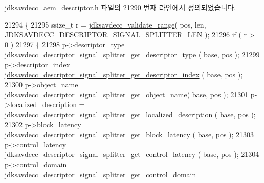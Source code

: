 jdksavdecc\+\_\+aem\+\_\+descriptor.\+h 파일의 21290 번째 라인에서 정의되었습니다.


\begin{DoxyCode}
21294 \{
21295     ssize\_t r = \hyperlink{group__util_ga9c02bdfe76c69163647c3196db7a73a1}{jdksavdecc\_validate\_range}( pos, len, 
      \hyperlink{group__descriptor__signal__splitter_ga3afbcd74a73da7fe7c5eee3c13fad7f3}{JDKSAVDECC\_DESCRIPTOR\_SIGNAL\_SPLITTER\_LEN} );
21296     \textcolor{keywordflow}{if} ( r >= 0 )
21297     \{
21298         p->\hyperlink{structjdksavdecc__descriptor__signal__splitter_ab7c32b6c7131c13d4ea3b7ee2f09b78d}{descriptor\_type} = 
      \hyperlink{group__descriptor__signal__splitter_ga2d820535595d7a1730629dc8cfe72a04}{jdksavdecc\_descriptor\_signal\_splitter\_get\_descriptor\_type}
      ( base, pos );
21299         p->\hyperlink{structjdksavdecc__descriptor__signal__splitter_a042bbc76d835b82d27c1932431ee38d4}{descriptor\_index} = 
      \hyperlink{group__descriptor__signal__splitter_ga4fe9ee5536c672b456535486c30be9fa}{jdksavdecc\_descriptor\_signal\_splitter\_get\_descriptor\_index}
      ( base, pos );
21300         p->\hyperlink{structjdksavdecc__descriptor__signal__splitter_a7d1f5945a13863b1762fc6db74fa8f80}{object\_name} = 
      \hyperlink{group__descriptor__signal__splitter_gac38a72dc2c8d33e642ee20458c317335}{jdksavdecc\_descriptor\_signal\_splitter\_get\_object\_name}(
       base, pos );
21301         p->\hyperlink{structjdksavdecc__descriptor__signal__splitter_a0926f846ca65a83ad5bb06b4aff8f408}{localized\_description} = 
      \hyperlink{group__descriptor__signal__splitter_ga298db41e20729dde86f44a7c5db0d539}{jdksavdecc\_descriptor\_signal\_splitter\_get\_localized\_description}
      ( base, pos );
21302         p->\hyperlink{structjdksavdecc__descriptor__signal__splitter_ae2e9f0088d5e900b610d1b2818dfc559}{block\_latency} = 
      \hyperlink{group__descriptor__signal__splitter_ga3483655129d2898c4a16892d6fcae3d8}{jdksavdecc\_descriptor\_signal\_splitter\_get\_block\_latency}
      ( base, pos );
21303         p->\hyperlink{structjdksavdecc__descriptor__signal__splitter_ab2bd4639caaf9a8078b68368afbd63b6}{control\_latency} = 
      \hyperlink{group__descriptor__signal__splitter_gad263632abe4a6b67481a151dd84950b0}{jdksavdecc\_descriptor\_signal\_splitter\_get\_control\_latency}
      ( base, pos );
21304         p->\hyperlink{structjdksavdecc__descriptor__signal__splitter_a8937b22996b7c28ae209f29fe777f03a}{control\_domain} = 
      \hyperlink{group__descriptor__signal__splitter_ga5c6c58ab3ffa279d14705c6368734427}{jdksavdecc\_descriptor\_signal\_splitter\_get\_control\_domain}

\end{DoxyCode}

